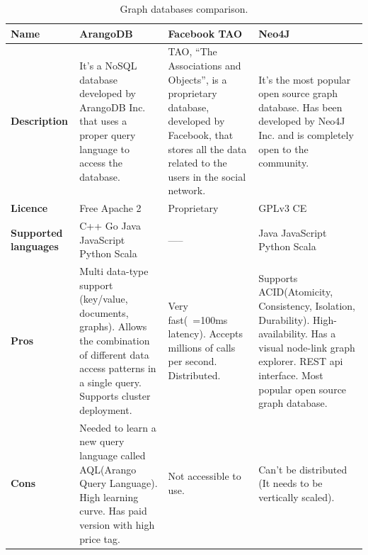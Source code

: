 \begin{table}[!b]
\caption{Graph databases comparison.}
\label{table:graph_databases_comparison}
\centering
\large
\begin{tabularx}{\linewidth} {
    |>{\hsize=0.7\hsize}X| 
     >{\hsize=1.1\hsize}X|
     >{\hsize=1.1\hsize}X| 
     >{\hsize=1.1\hsize}X| }
    \hline
    \textbf{Name} 
    & ArangoDB \cite{arangodb_documentation}
    & Facebook TAO \cite{facebook_tao_article}
    & Neo4J \cite{neo4j_documentation} \\ \hline
    \textbf{Description} 
    & It's a NoSQL database developed by ArangoDB Inc. that uses a proper query language to access the database.
    & TAO, “The Associations and Objects”, is a proprietary database, developed by Facebook, that stores all the data related to the users in the social network. 
    & It's the most popular open source graph database. Has been developed by Neo4J Inc. and is completely open to the community. \\ \hline
    \textbf{Licence}
    & Free Apache 2 
    & Proprietary 
    & GPLv3 CE \\ \hline
    \textbf{Supported languages} 
    & C++ \newline 
    Go \newline
    Java \newline
    JavaScript \newline
    Python \newline
    Scala
    & \centering -----
    & Java \newline
    JavaScript \newline
    Python \newline
    Scala \\ \hline
    \textbf{Pros} 
    & Multi data-type support (key/value, documents, graphs). Allows the combination of different data access patterns in a single query. Supports cluster deployment. 
    & Very fast(~=100ms latency). Accepts millions of calls per second. Distributed.
    & Supports ACID(Atomicity, Consistency, Isolation, Durability)\cite{acid_definition}. High-availability. Has a visual node-link graph explorer. REST \gls{api} interface. Most popular open source graph database. \\ \hline
    \textbf{Cons} 
    & Needed to learn a new query language called AQL(Arango Query Language). High learning curve. Has paid version with high price tag.
    & Not accessible to use.
    & Can’t be distributed (It needs to be vertically scaled). \\ \hline
\end{tabularx}
\end{table}

